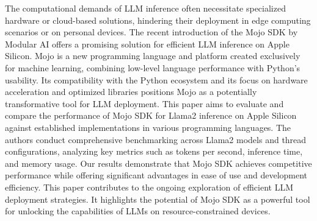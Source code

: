 \documentclass[sigconf]{acmart}
\begin{document}
The computational demands of LLM inference often necessitate specialized hardware or cloud-based solutions, hindering their deployment in edge computing scenarios or on personal devices. The recent introduction of the Mojo SDK by Modular AI offers a promising solution for efficient LLM inference on Apple Silicon. Mojo is a new programming language and platform created exclusively for machine learning, combining low-level language performance with Python's usability. Its compatibility with the Python ecosystem and its focus on hardware acceleration and optimized libraries positions Mojo as a potentially transformative tool for LLM deployment.
This paper aims to evaluate and compare the performance of Mojo SDK for Llama2 inference on Apple Silicon against established implementations in various programming languages. The authors conduct comprehensive benchmarking across Llama2 models and thread configurations, analyzing key metrics such as tokens per second, inference time, and memory usage. Our results demonstrate that Mojo SDK achieves competitive performance while offering significant advantages in ease of use and development efficiency. This paper contributes to the ongoing exploration of efficient LLM deployment strategies. It highlights the potential of Mojo SDK as a powerful tool for unlocking the capabilities of LLMs on resource-constrained devices.
\end{document}
